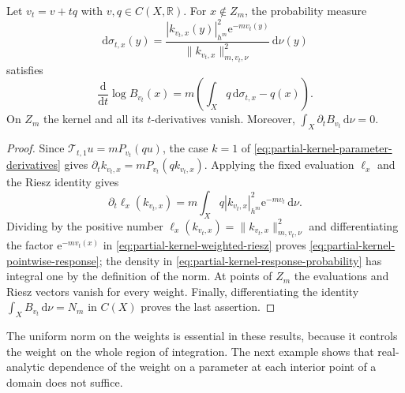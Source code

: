 \begin{corollary}\label{cor:partial-kernel-pointwise-response}
Let $v_t=v+tq$ with $v,q\in C(X,\mathbb R)$. For $x\notin Z_m$, the probability measure
\begin{equation}\label{eq:partial-kernel-response-probability}
 \mathrm{d}\sigma_{t,x}(y)
 =\frac{|k_{v_t,x}(y)|_{h^m}^2\mathrm{e}^{-mv_t(y)}}
        {\|k_{v_t,x}\|_{m,v_t,\nu}^2}\,\mathrm{d}\nu(y)
\end{equation}
satisfies
\begin{equation}\label{eq:partial-kernel-pointwise-response}
 \frac{\mathrm{d}}{\mathrm{d}t}\log B_{v_t}(x)
 =m\left(\int_Xq\,\mathrm{d}\sigma_{t,x}-q(x)\right).
\end{equation}
On $Z_m$ the kernel and all its $t$-derivatives vanish. Moreover,
$\int_X\partial_tB_{v_t}\,\mathrm{d}\nu=0$.
\end{corollary}
\begin{proof}
Since $\mathcal T_{t,1}u=mP_{v_t}(qu)$, the case $k=1$ of \eqref{eq:partial-kernel-parameter-derivatives} gives
$\partial_tk_{v_t,x}=mP_{v_t}(qk_{v_t,x})$. Applying the fixed evaluation $\ell_x$ and the Riesz identity gives
\[
 \partial_t\ell_x(k_{v_t,x})
 =m\int_Xq|k_{v_t,x}|_{h^m}^2
                \mathrm{e}^{-mv_t}\,\mathrm{d}\nu.
\]
Dividing by the positive number $\ell_x(k_{v_t,x})=\|k_{v_t,x}\|_{m,v_t,\nu}^2$ and differentiating the factor $\mathrm{e}^{-mv_t(x)}$ in \eqref{eq:partial-kernel-weighted-riesz} proves \eqref{eq:partial-kernel-pointwise-response}; the density in \eqref{eq:partial-kernel-response-probability} has integral one by the definition of the norm. At points of $Z_m$ the evaluations and Riesz vectors vanish for every weight. Finally, differentiating the identity $\int_XB_{v_t}\,\mathrm{d}\nu=N_m$ in $C(X)$ proves the last assertion.
\end{proof}

The uniform norm on the weights is essential in these results, because it controls the weight on the whole region of integration. The next example shows that real-analytic dependence of the weight on a parameter at each interior point of a domain does not suffice.

